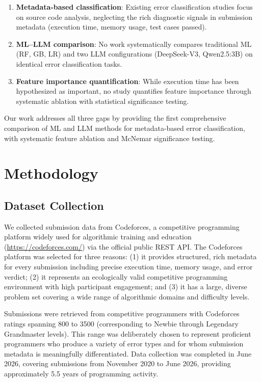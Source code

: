\documentclass[acmsmall]{acmart}
\begin{document}
\begin{enumerate}
 \item \textbf{Metadata-based classification}: Existing error classification
 studies focus on source code analysis, neglecting the rich diagnostic
 signals in submission metadata (execution time, memory usage, test cases
 passed).
 \item \textbf{ML--LLM comparison}: No work systematically compares traditional
 ML (RF, GB, LR) and two LLM configurations (DeepSeek-V3, Qwen2.5:3B)
 on identical error classification tasks.
 \item \textbf{Feature importance quantification}: While execution time has been
 hypothesized as important, no study quantifies feature importance through
 systematic ablation with statistical significance testing.
\end{enumerate}

Our work addresses all three gaps by providing the first comprehensive comparison
of ML and LLM methods for metadata-based error classification, with systematic
feature ablation and McNemar significance testing.

\section{Methodology}

\subsection{Dataset Collection}

We collected submission data from Codeforces, a competitive programming platform widely used for algorithmic training and education~\cite{mirzayanov2020codeforces,zhang2022automated} (\url{https://codeforces.com/})
via the official public REST API. The Codeforces
platform was selected for three reasons: (1) it provides structured, rich
metadata for every submission including precise execution time, memory usage,
and error verdict; (2) it represents an ecologically valid competitive
programming environment with high participant engagement; and (3) it has a
large, diverse problem set covering a wide range of algorithmic domains and
difficulty levels.

Submissions were retrieved from competitive programmers with Codeforces
ratings spanning 800 to 3500 (corresponding to Newbie through Legendary
Grandmaster levels). This range was deliberately chosen to represent
proficient programmers who produce a variety of error types and for whom
submission metadata is meaningfully differentiated. Data collection was
completed in June 2026, covering submissions from November 2020 to June
2026, providing approximately 5.5 years of programming activity.
\end{document}
